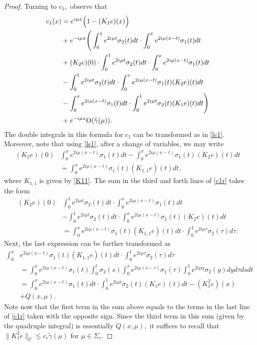 \documentclass[11pt]{amsart}
\theoremstyle{plain}
\theoremstyle{definition}
\theoremstyle{remark}
\numberwithin{equation}{section}
\begin{document}
\begin{proof}
Turning to $c_1,$ observe that
\begin{align}
c_1(x)
&=e^{i\mu x}\Big(1-(K_{1}e)(x)\Big)\nonumber\\
&+e^{-i\mu x}\Bigg(\int_0^1e^{2i \mu t}\sigma_2(t) dt\cdot\int_0^xe^{2i \mu (x-t)}\sigma_1(t) dt \nonumber\\
&+ (K_2e)(0) \cdot\int_0^1e^{2i \mu t}\sigma_2(t) dt  \cdot\int_0^xe^{2i \mu (x-t)}\sigma_1(t) dt \label{c1r}\\
&-  \int_0^1e^{2i \mu t}\sigma_2(t) dt  \cdot\int_0^xe^{2i \mu (x-t)}\sigma_1(t)(K_2e)(t) dt \nonumber\\
&- \int_0^xe^{2i \mu (x-t)}\sigma_1(t) dt\cdot \int_0^1e^{2i \mu t}\sigma_2(t)(K_1e)(t) dt\Bigg)\nonumber\\
&+e^{-i\mu x}{\rm O}(\widetilde{\gamma}(\mu)). \nonumber
\end{align}
The double integrals in this formula for $c_1$ can be transformed as in \eqref{lc1}.
Moreover, note that using \eqref{ls1}, after a change of variables, we may write
\begin{align*}
(K_2e)(0) &  \int_0^xe^{2i \mu (x-t)}\sigma_1(t) dt - \int_0^xe^{2i \mu (x-t)}\sigma_1(t)(K_2e)(t) dt \\
& = \int_0^xe^{2i \mu (x-t)}\sigma_1(t)(K_{1,1}e)(t)  dt,
\end{align*}
where $K_{1,1}$ is given by \eqref{K11}.
The sum in the third and forth lines of \eqref{c1r} takes the form
\begin{align*}
(K_2e)(0) & \int_0^1e^{2i \mu t}\sigma_2(t) dt  \cdot\int_0^xe^{2i \mu (x-t)}\sigma_1(t) dt \\
&- \int_0^1e^{2i \mu t}\sigma_2(t) dt  \cdot\int_0^xe^{2i \mu (x-t)}\sigma_1(t)(K_2e)(t) dt \\
& = \int_0^xe^{2i \mu (x-t)}\sigma_1(t)(K_{1,1}e)(t)  dt\cdot \int_0^1  e^{2i \mu \tau}\sigma_2(\tau) d\tau.
\end{align*}
Next, the last expression can be further transformed as
\begin{align*}
\int_0^x&e^{2i \mu (x-t)}\sigma_1(t)(K_{1,1}e)(t)  dt\cdot \int_0^1e^{2i \mu \tau}\sigma_2(\tau) d\tau  \\
& =  \int_0^xe^{2i \mu (x-t)}\sigma_1(t)\int_0^t\sigma_2(s)\int_0^se^{2i\mu(s-\tau)}\sigma_1(\tau)\int_0^1e^{2i \mu y}\sigma_2(y) dy d\tau ds dt \\
&= \int_0^xe^{2i \mu (x-t)}\sigma_1(t)dt \cdot \int_0^1e^{2i \mu t}\sigma_2(t)(K_1e)(t) dt-(K_{1}^2e)(x)\\
& + Q(x,\mu).
\end{align*}
Note now that the first term in the sum above equals to the terms in the last line  of
 \eqref{c1r} taken with the opposite sign. %
Since the third term in this sum (given by the quadruple integral)  is essentially
$Q(x,\mu),$ it suffices to recall that $\|K^2_1e\|_{\mathcal{C}}\leq c_r\widetilde{\gamma}(\mu)$
for $\mu \in \Sigma_r.$
\end{proof}
\end{document}
